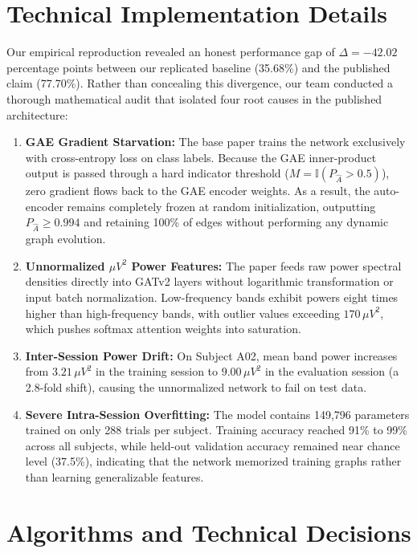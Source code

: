 \documentclass[12pt,a4paper]{report}
\begin{document}
\section{Technical Implementation Details}
Our empirical reproduction revealed an honest performance gap of $\Delta = -42.02$ percentage points between our replicated baseline (35.68\%) and the published claim (77.70\%). Rather than concealing this divergence, our team conducted a thorough mathematical audit that isolated four root causes in the published architecture:
\begin{enumerate}[leftmargin=1.5em]
    \item \textbf{GAE Gradient Starvation:} The base paper trains the network exclusively with cross-entropy loss on class labels. Because the GAE inner-product output is passed through a hard indicator threshold ($M = \mathbb{I}(P_{\hat{A}} > 0.5)$), zero gradient flows back to the GAE encoder weights. As a result, the auto-encoder remains completely frozen at random initialization, outputting $P_{\hat{A}} \ge 0.994$ and retaining 100\% of edges without performing any dynamic graph evolution.
    \item \textbf{Unnormalized $\mu V^2$ Power Features:} The paper feeds raw power spectral densities directly into GATv2 layers without logarithmic transformation or input batch normalization. Low-frequency bands exhibit powers eight times higher than high-frequency bands, with outlier values exceeding $170\,\mu V^2$, which pushes softmax attention weights into saturation.
    \item \textbf{Inter-Session Power Drift:} On Subject A02, mean band power increases from $3.21\,\mu V^2$ in the training session to $9.00\,\mu V^2$ in the evaluation session (a 2.8-fold shift), causing the unnormalized network to fail on test data.
    \item \textbf{Severe Intra-Session Overfitting:} The model contains 149,796 parameters trained on only 288 trials per subject. Training accuracy reached 91\% to 99\% across all subjects, while held-out validation accuracy remained near chance level (37.5\%), indicating that the network memorized training graphs rather than learning generalizable features.
\end{enumerate}

\section{Algorithms and Technical Decisions}
\end{document}
